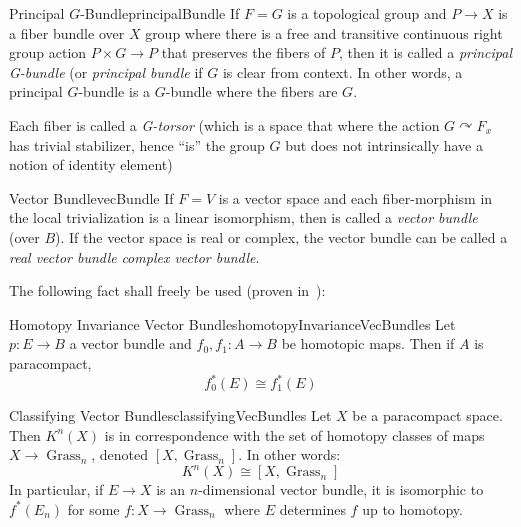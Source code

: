 \documentclass{ut-thesis}
\newenvironment{Proof}[1][]
  {\begin{ProofTcb}[#1]}
  {\end{ProofTcb}}
\newcommand{\qn}{\quad\newline}
\newcommand{\Grass}{{\operatorname{Grass}}}
\newcommand{\actson}{\curvearrowright}
\begin{document}
\begin{defn}{Principal $G$-Bundle}{principalBundle}
	If $F = G$ is a topological group and $P \to X$ is a fiber bundle over $X$ group where there is a free and
	transitive continuous
	right group action $P\times G \to P$ that preserves the fibers of $P$, then it is called a \emph{principal
	G-bundle} (or \emph{principal bundle} if $G$ is clear from context. In other words, a principal $G$-bundle
  is a $G$-bundle where the fibers are $G$.

	\qn
	Each fiber is called a \emph{G-torsor} (which is a space that where the action $G\actson F_x$ has trivial
	stabilizer, hence ``is'' the group $G$ but does not intrinsically have a notion of identity element)
\end{defn}

\begin{defn}{Vector Bundle}{vecBundle}
	If $F =V$ is a vector space and each
	fiber-morphism in the local trivialization is a linear isomorphism, then is called a \emph{vector bundle}
	(over $B$). If the vector space is real or complex, the vector bundle can be called a \emph{real vector
	bundle} \emph{complex vector bundle}.
\end{defn}

The following fact shall freely be used (proven in~\cite{NateKTheory}):

\begin{thm}{Homotopy Invariance Vector Bundles}{homotopyInvarianceVecBundles}
	Let $p: E \to B$ a vector bundle and $f_0,f_1: A \to B$ be homotopic maps. Then if $A$ is paracompact,
	\[
		f_0^*(E) \cong f_1^*(E)
	\]
\end{thm}

\begin{Proof}
  \cite[section~1.2]{NateKTheory}
\end{Proof}

\begin{thm}{Classifying Vector Bundles}{classifyingVecBundles}
	Let $X$ be a paracompact space. Then $K^n(X)$ is in correspondence with the set of homotopy
	classes of maps $X \to \Grass_n$, denoted $[X, \Grass_n]$. In other words:
	\[
		K^n(X) \cong [X,\Grass_n]
	\]
	In particular, if $E \to X$ is an $n$-dimensional vector bundle, it is isomorphic to $f^*(E_n)$ for some
	$f: X \to \Grass_n$ where $E$ determines $f$ up to homotopy.
\end{thm}
\end{document}
